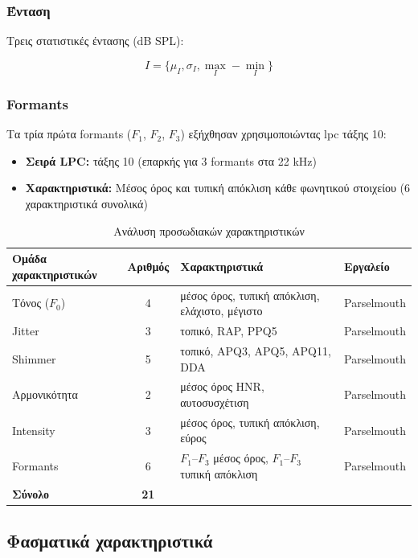 \subsubsection{Ένταση}

Τρεις στατιστικές έντασης (dB SPL):

\begin{equation}
I = \{\mu_I, \sigma_I, \max_I - \min_I\}
\end{equation}

\subsubsection{Formants}

Τα τρία πρώτα formants ($F_1$, $F_2$, $F_3$) εξήχθησαν χρησιμοποιώντας \gls{lpc} τάξης 10:

\begin{itemize}
    \item \textbf{Σειρά LPC:} τάξης 10 (επαρκής για 3 formants στα 22 kHz)
    \item \textbf{Χαρακτηριστικά:} Μέσος όρος και τυπική απόκλιση κάθε φωνητικού στοιχείου (6 χαρακτηριστικά συνολικά)
\end{itemize}

\begin{table}[H]
\centering
\begin{tabular}{@{}lcll@{}}
\toprule
\textbf{Ομάδα χαρακτηριστικών} & \textbf{Αριθμός} & \textbf{Χαρακτηριστικά} & \textbf{Εργαλείο} \\
\midrule
Τόνος ($F_0$) & 4 & μέσος όρος, τυπική απόκλιση, ελάχιστο, μέγιστο & Parselmouth \\
Jitter & 3 & τοπικό, RAP, PPQ5 & Parselmouth \\
Shimmer & 5 & τοπικό, APQ3, APQ5, APQ11, DDA & Parselmouth \\
Αρμονικότητα & 2 & μέσος όρος HNR, αυτοσυσχέτιση & Parselmouth \\
Intensity & 3 & μέσος όρος, τυπική απόκλιση, εύρος & Parselmouth \\
Formants & 6 & $F_1$--$F_3$ μέσος όρος, $F_1$--$F_3$ τυπική απόκλιση & Parselmouth \\
\midrule
\textbf{Σύνολο} & \textbf{21} & & \\
\bottomrule
\end{tabular}
\caption{Ανάλυση προσωδιακών χαρακτηριστικών}
\label{tab:prosodic-features}
\end{table}

\subsection{Φασματικά χαρακτηριστικά}

